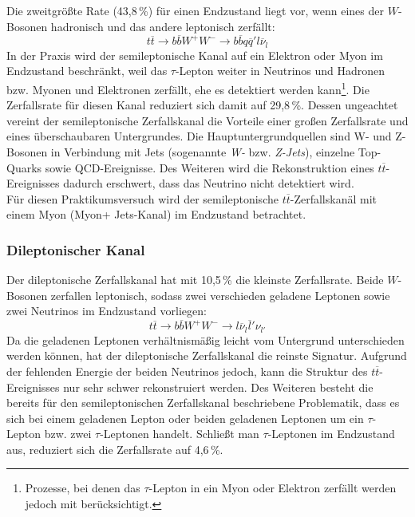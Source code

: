 Die zweitgr\"o\ss{}te Rate (43,8\,\%) f\"ur einen Endzustand liegt vor, wenn eines der $W$-Bosonen hadronisch und das andere leptonisch zerf\"allt:
\begin{equation*}
t\overline{t}\rightarrow b\overline{b}W^{+}W^{-}\rightarrow b\overline{b}q\overline{q}'l\overline{\nu}_{l}
\end{equation*}
In der Praxis wird der semileptonische Kanal auf ein Elektron oder Myon im Endzustand beschr\"ankt, weil das $\tau$-Lepton weiter in Neutrinos und Hadronen bzw. Myonen und Elektronen zerf\"allt, ehe es detektiert werden kann\footnote{Prozesse, bei denen das $\tau$-Lepton in ein Myon oder Elektron zerf\"allt werden jedoch mit ber\"ucksichtigt.}. Die Zerfallsrate f\"ur diesen Kanal reduziert sich damit auf 29,8\,\%. Dessen ungeachtet vereint der semileptonische Zerfalls\-kanal die Vorteile einer gro\ss{}en Zerfallsrate und eines \"uberschaubaren Untergrundes. Die Hauptuntergrundquellen sind W- und Z-Bosonen in Verbindung mit Jets (sogenannte \textit{W-} bzw. \textit{Z-Jets}), einzelne Top-Quarks sowie QCD-Ereignisse. Des Weiteren wird die Rekonstruktion eines $t\overline{t}$-Ereignisses dadurch erschwert, dass das Neutrino nicht detektiert wird. \\
F\"ur diesen Praktikumsversuch wird der semileptonische $t\overline{t}$-Zerfallskan\"al mit einem My\-on (Myon+ Jets-Kanal) im Endzustand betrachtet.

\subsubsection*{Dileptonischer Kanal}
Der dileptonische Zerfallskanal hat mit 10,5\,\% die kleinste Zerfallsrate. Beide $W$-Bosonen zerfallen leptonisch, sodass zwei verschieden geladene Leptonen sowie zwei Neutrinos im Endzustand vorliegen:
\begin{equation*}
t\overline{t}\rightarrow b\overline{b}W^{+}W^{-}\rightarrow l\overline{\nu}_{l}\overline{l}'\nu_{l'}
\end{equation*}
Da die geladenen Leptonen verh\"altnism\"a\ss{}ig leicht vom Untergrund unterschieden werden k\"onnen, hat der dileptonische Zerfallskanal die reinste Signatur. Aufgrund der fehlenden Energie der beiden Neutrinos jedoch, kann die Struktur des $t\overline{t}$-Ereignisses nur sehr schwer rekonstruiert werden. Des Weiteren besteht die bereits f\"ur den semileptonischen Zerfalls\-kanal beschriebene Problematik, dass es sich bei einem geladenen Lepton oder beiden geladenen Leptonen um ein $\tau$-Lepton bzw. zwei $\tau$-Leptonen handelt. Schlie\ss{}t man $\tau$-Leptonen im Endzustand aus, reduziert sich die Zerfallsrate auf 4,6\,\%.


